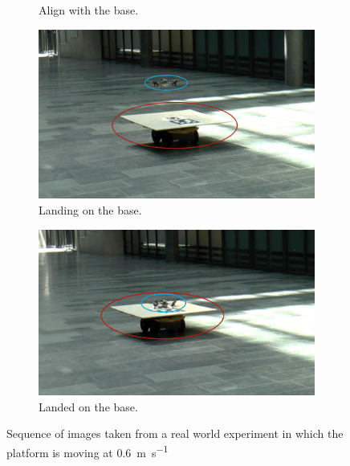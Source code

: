 \begin{figure}[!htbp]
\begin{subfigure}[b]{0.5\textwidth}
        \caption{Align with the base.}
        \label{fig:three}
   \end{subfigure}
    \begin{subfigure}[b]{0.5\textwidth}
        \includegraphics[width=\textwidth]{img/landing1.jpg}
        \caption{Landing on the base.}
        \label{fig:four}
   \end{subfigure} 
    \begin{subfigure}[b]{0.5\textwidth}
        \includegraphics[width=\textwidth]{img/landed1.jpg}
        \caption{Landed on the base.}
        \label{fig:five}
   \end{subfigure}
   
  \caption{Sequence of images taken from a real world experiment in which the platform is moving at \SI{0.6}{\meter \per \second} }
  \label{fig:landing3}
\end{figure} 




 

